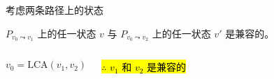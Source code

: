 \begin{frame}{}
  \centerline{ 考虑两条路径上的状态}

  \begin{clemma}
    $P_{v_0 \leadsto v_1}$ 上的任一状态 $v$ 与 $P_{v_0 \leadsto v_2}$ 上的任一状态 $v'$ 是兼容的。
  \end{clemma}

  \begin{columns}
	\[
	  v_0 = \text{LCA}(v_1, v_2)
	\]

	\pause
	\vspace{0.50cm}
	\begin{center}
	  \hl{$\therefore$ $v_1$ 和 $v_2$ 是兼容的}
	\end{center}
  \end{columns}
\end{frame}
